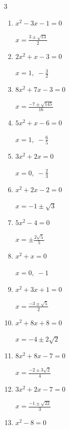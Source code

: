 \begin{multicols}{3}
\begin{enumerate}
        $\displaystyle x=\frac{-7\pm \sqrt{13}}{18}$

  \item $x^{2}-3x-1=0$

        $\displaystyle x=\frac{3\pm \sqrt{13}}{2}$

\columnbreak %

\resetques

  \item $2x^{2}+x-3=0$

        $\displaystyle x=1, \; -\frac{3}{2}$

  \item $8x^{2}+7x-3=0$

        $\displaystyle x=\frac{-7\pm \sqrt{145}}{16}$

  \item $5x^{2}+x-6=0$

        $\displaystyle x=1, \; -\frac{6}{5}$

  \item $3x^{2}+2x=0$

        $\displaystyle x=0, \; -\frac{2}{3}$

  \item $x^{2}+2x-2=0$

        $\displaystyle x=-1\pm \sqrt{3}$

  \item $5x^{2}-4=0$

        $\displaystyle x=\pm \frac{2\sqrt{5}}{5}$

  \item $x^{2}+x=0$

        $\displaystyle x=0, \; -1$

\columnbreak %

  \item $x^{2}+3x+1=0$

        $\displaystyle x=\frac{-3\pm \sqrt{5}}{2}$

  \item $x^{2}+8x+8=0$

        $\displaystyle x=-4\pm 2\sqrt{2}$

  \item $8x^{2}+8x-7=0$

        $\displaystyle x=\frac{-2\pm 3\sqrt{2}}{4}$

  \item $3x^{2}+2x-7=0$

        $\displaystyle x=\frac{-1\pm \sqrt{22}}{3}$

  \item $x^{2}-8=0$


\end{enumerate}
\end{multicols}
